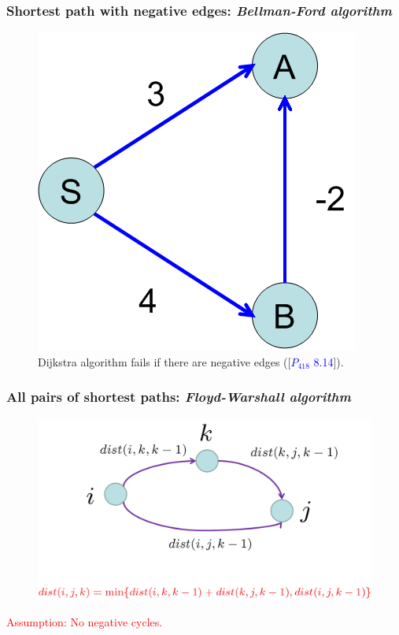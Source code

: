 \begin{frame}
  \frametitle{Shortest path with negative edges: \emph{Bellman-Ford algorithm}}

  \begin{figure}
    \begin{center}
      \includegraphics[scale=0.40]{figure/bfs_dfs/dijkstranegative}
      \caption{{\scriptsize Dijkstra algorithm fails if there are negative edges ([\textcolor{blue}{$P_{418}$ 8.14}]).}}
      \label{fig:dijkstranegative}
    \end{center}
  \end{figure}

\end{frame}



\begin{frame}
  \frametitle{All pairs of shortest paths: \emph{Floyd-Warshall algorithm}}

  \begin{figure}
    \begin{center}
      \includegraphics[scale=0.40]{figure/bfs_dfs/warshall}
      \label{fig:warshall}
    \end{center}
  \end{figure}

  \pause
  \vspace{0.40cm}
  \textcolor{red}{Assumption: No negative cycles.}

\end{frame}


